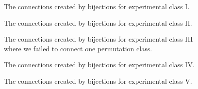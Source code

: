 \label{ch:connect}

\begin{figure}[ht!]
    \centering
    
    \caption{The connections created by bijections for experimental class I.}
    \label{fig:expgrp_I}
\end{figure}


\begin{figure}[ht!]
    \centering
    
    \caption{The connections created by bijections for experimental class II.}
    \label{fig:expgrp_II}
\end{figure}


\begin{figure}[ht!]
    \centering
    
    \caption{The connections created by bijections for experimental class III where we failed to connect one permutation class.}
    \label{fig:expgrp_III}
\end{figure}


\begin{figure}[ht!]
    \centering
    
    \caption{The connections created by bijections for experimental class IV.}
    \label{fig:expgrp_IV}
\end{figure}


\begin{figure}[ht!]
    \centering
    
    \caption{The connections created by bijections for experimental class V.}
    \label{fig:expgrp_V}
\end{figure}


\begin{comment}
\begin{figure}[ht!]
    \centering
    
    \caption{The connections created by bijections for experimental class VI.}
    \label{fig:expgrp_VI}
\end{figure}
\end{comment}


\begin{comment}
\begin{figure}[ht!]
    \centering
    
    \caption{The connections created by bijections for experimental class VII.}
    \label{fig:expgrp_VII}
\end{figure}
\end{comment}


